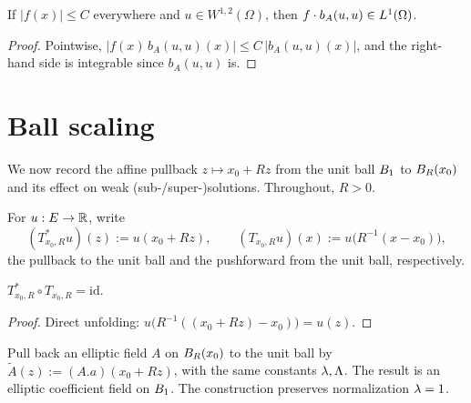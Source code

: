 \begin{lemma}
\label{lem:integrable_bounded_mul_bilinFormIntegrand}
\leanok
{}
If $|f(x)| \leq C$ everywhere and $u \in W^{1,2}(\Omega)$, then $f \cdot b_A(u,u) \in L^{1}(\Omega)$.
\end{lemma}

\begin{proof}
\leanok
{}

Pointwise, $|f(x)\,b_A(u,u)(x)| \leq C \,|b_A(u,u)(x)|$, and the right-hand side is integrable since $b_A(u,u)$ is.
\end{proof}

\section{Ball scaling}

We now record the affine pullback $z \mapsto x_0 + R z$ from the unit ball $B_{1}$ to $B_{R}(x_0)$ and its effect on weak (sub-/super-)solutions. Throughout, $R > 0$.

\begin{definition}
\label{def:rescaleToUnitBall}
\leanok
For $u : E \to \mathbb{R}$, write
\begin{equation*}
  (T^{*}_{x_0,R} u)(z) := u(x_0 + R z), \qquad
  (T_{x_0,R} u)(x) := u\bigl(R^{-1}(x - x_0)\bigr),
\end{equation*}
the pullback to the unit ball and the pushforward from the unit ball, respectively.
\end{definition}

\begin{lemma}
\label{lem:rescaleToUnitBall_transportFromUnitBall}
\leanok
{}
$T^{*}_{x_0,R} \circ T_{x_0,R} = \mathrm{id}$.
\end{lemma}

\begin{proof}
\leanok

Direct unfolding: $u\bigl(R^{-1}((x_0 + Rz) - x_0)\bigr) = u(z)$.
\end{proof}

\begin{definition}
\label{def:rescaleCoeffToUnitBall}
\leanok
{}
Pull back an elliptic field $A$ on $B_{R}(x_0)$ to the unit ball by $\widetilde A(z) := (A.a)(x_0 + R z)$, with the same constants $\lambda, \Lambda$. The result is an elliptic coefficient field on $B_{1}$. The construction preserves normalization $\lambda = 1$.
\end{definition}

